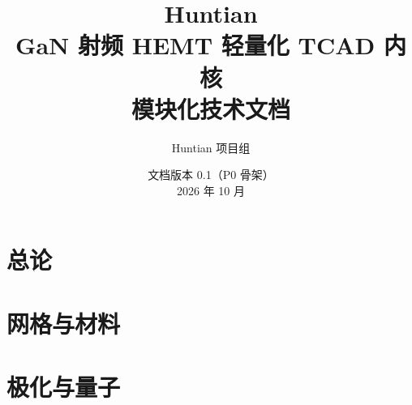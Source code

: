 \documentclass[
  UTF8,
  12pt,
  oneside,
  openany,
  fontset=windows
]{ctexbook}
\title{\bfseries Huntian\\[0.3em]
       \large GaN 射频 HEMT 轻量化 TCAD 内核\\[0.15em]
       \large 模块化技术文档}
\author{Huntian 项目组}
\date{文档版本 0.1（P0 骨架）\\ 2026 年 10 月}
\begin{document}
\frontmatter
\maketitle
\tableofcontents






\mainmatter

\part{总论}

\part{网格与材料}

\part{极化与量子}

\end{document}

